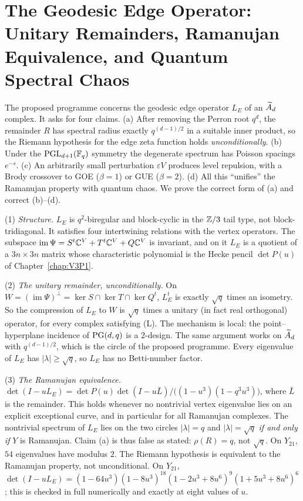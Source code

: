 \chapter{The Geodesic Edge Operator: Unitary Remainders, Ramanujan Equivalence, and Quantum Spectral Chaos}\label{chap:V3P4}
\begin{chapterabstract}
The proposed programme concerns the geodesic edge operator $L_E$ of an $\widetilde A_{d}$ complex. It
asks for four claims. (a) After removing the Perron root $q^{d}$, the remainder $R$ has
spectral radius exactly $q^{(d-1)/2}$ in a suitable inner product, so the Riemann hypothesis
for the edge zeta function holds \emph{unconditionally}. (b) Under the $\mathrm{PGL}_{d+1}(\mathbb{F}_q)$
symmetry the degenerate spectrum has Poisson spacings $e^{-s}$. (c) An arbitrarily small
perturbation $\varepsilon V$ produces level repulsion, with a Brody crossover to GOE ($\beta=1$)
or GUE ($\beta=2$). (d) All this ``unifies'' the Ramanujan property with quantum chaos. We
prove the correct form of (a) and correct (b)--(d).

(1) \emph{Structure.} $L_E$ is $q^{2}$-biregular and block-cyclic in the $\mathbb{Z}/3$ tail type,
not block-tridiagonal. It satisfies four intertwining relations with the vertex operators.
The subspace $\operatorname{im}\Psi=S^{t}\mathbb{C}^{V}+T^{t}\mathbb{C}^{V}+Q\mathbb{C}^{V}$ is invariant, and on it
$L_E$ is a quotient of a $3n\times3n$ matrix whose characteristic polynomial is the Hecke
pencil $\det P(u)$ of Chapter~\ref{chap:V3P1}.

(2) \emph{The unitary remainder, unconditionally.} On
$W=(\operatorname{im}\Psi)^{\perp}=\ker S\cap\ker T\cap\ker Q^{t}$, $L_E^{t}$ is exactly $\sqrt
q$ times an isometry. So the compression of $L_E$ to $W$ is $\sqrt q$ times a unitary (in fact
real orthogonal) operator, for every complex satisfying (L). The mechanism is local: the
point--hyperplane incidence of $\mathrm{PG}(d,q)$ is a $2$-design. The same argument works on
$\widetilde A_{d}$ with $q^{(d-1)/2}$, which is the circle of the proposed programme. Every eigenvalue of
$L_E$ has $|\lambda|\ge\sqrt q$, so $L_E$ has no Betti-number factor.

(3) \emph{The Ramanujan equivalence.} $\det(I-uL_E)=\det
P(u)\det(I-u\bar L)/\bigl((1-u^{3})(1-q^{3}u^{3})\bigr)$, where $\bar L$ is the remainder. This
holds whenever no nontrivial vertex eigenvalue lies on an explicit exceptional curve, and in
particular for all Ramanujan complexes. The nontrivial spectrum of $L_E$ lies on the two
circles $|\lambda|=q$ and $|\lambda|=\sqrt q$ \emph{if and only if} $Y$ is Ramanujan. Claim (a)
is thus false as stated: $\rho(R)=q$, not $\sqrt q$. On $Y_{21}$, $54$ eigenvalues have
modulus $2$. The Riemann hypothesis is equivalent to the Ramanujan property, not
unconditional. On $Y_{21}$,
$\det(I-uL_E)=(1-64u^{3})(1-8u^{3})^{18}(1-2u^{3}+8u^{6})^{9}(1+5u^{3}+8u^{6})^{6}$; this is
checked in full numerically and exactly at eight values of $u$.


\end{chapterabstract}
